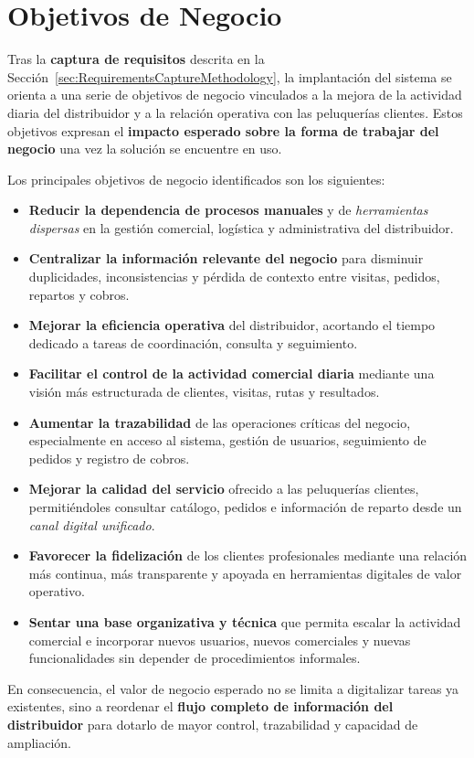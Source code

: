 \section{Objetivos de Negocio}
\label{sec:BusinessObjectives}

Tras la \textbf{captura de requisitos} descrita en la Sección~\ref{sec:RequirementsCaptureMethodology}, la implantación del sistema se orienta a una serie de objetivos de negocio vinculados a la mejora de la actividad diaria del distribuidor y a la relación operativa con las peluquerías clientes. Estos objetivos expresan el \textbf{impacto esperado sobre la forma de trabajar del negocio} una vez la solución se encuentre en uso.

Los principales objetivos de negocio identificados son los siguientes:

\begin{itemize}
    \item \textbf{Reducir la dependencia de procesos manuales} y de \textit{herramientas dispersas} en la gestión comercial, logística y administrativa del distribuidor.
    \item \textbf{Centralizar la información relevante del negocio} para disminuir duplicidades, inconsistencias y pérdida de contexto entre visitas, pedidos, repartos y cobros.
    \item \textbf{Mejorar la eficiencia operativa} del distribuidor, acortando el tiempo dedicado a tareas de coordinación, consulta y seguimiento.
    \item \textbf{Facilitar el control de la actividad comercial diaria} mediante una visión más estructurada de clientes, visitas, rutas y resultados.
    \item \textbf{Aumentar la trazabilidad} de las operaciones críticas del negocio, especialmente en acceso al sistema, gestión de usuarios, seguimiento de pedidos y registro de cobros.
    \item \textbf{Mejorar la calidad del servicio} ofrecido a las peluquerías clientes, permitiéndoles consultar catálogo, pedidos e información de reparto desde un \textit{canal digital unificado}.
    \item \textbf{Favorecer la fidelización} de los clientes profesionales mediante una relación más continua, más transparente y apoyada en herramientas digitales de valor operativo.
    \item \textbf{Sentar una base organizativa y técnica} que permita escalar la actividad comercial e incorporar nuevos usuarios, nuevos comerciales y nuevas funcionalidades sin depender de procedimientos informales.
\end{itemize}

En consecuencia, el valor de negocio esperado no se limita a digitalizar tareas ya existentes, sino a reordenar el \textbf{flujo completo de información del distribuidor} para dotarlo de mayor control, trazabilidad y capacidad de ampliación.
